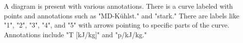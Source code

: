 A diagram is present with various annotations. There is a curve labeled with points and annotations such as "MD-Kühlst." and "stark." There are labels like "1", "2", "3", "4", and "5" with arrows pointing to specific parts of the curve. Annotations include "T [kJ/kg]" and "p/kJ/kg."